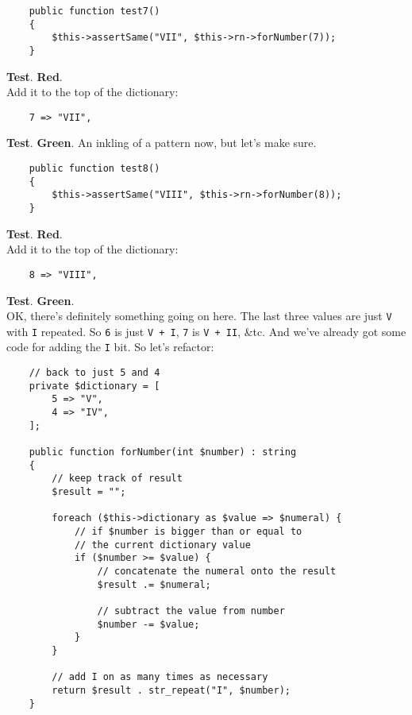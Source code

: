\begin{verbatim}
    public function test7()
    {
        $this->assertSame("VII", $this->rn->forNumber(7));
    }
\end{verbatim}

\textbf{Test}. \textbf{Red}.
\\

Add it to the top of the dictionary:

\begin{verbatim}
    7 => "VII",
\end{verbatim}

\textbf{Test}. \textbf{Green}. An inkling of a pattern now, but let's make sure.

\begin{verbatim}
    public function test8()
    {
        $this->assertSame("VIII", $this->rn->forNumber(8));
    }
\end{verbatim}

\textbf{Test}. \textbf{Red}.
\\

Add it to the top of the dictionary:

\begin{verbatim}
    8 => "VIII",
\end{verbatim}

\textbf{Test}. \textbf{Green}.
\\

OK, there's definitely something going on here. The last three values are just \texttt{V} with \texttt{I} repeated. So \texttt{6} is just \texttt{V + I}, \texttt{7} is \texttt{V + II}, \&tc. And we've already got some code for adding the \texttt{I} bit. So let's refactor:

\begin{verbatim}
    // back to just 5 and 4
    private $dictionary = [
        5 => "V",
        4 => "IV",
    ];

    public function forNumber(int $number) : string
    {
        // keep track of result
        $result = "";

        foreach ($this->dictionary as $value => $numeral) {
            // if $number is bigger than or equal to
            // the current dictionary value
            if ($number >= $value) {
                // concatenate the numeral onto the result
                $result .= $numeral;

                // subtract the value from number
                $number -= $value;
            }
        }

        // add I on as many times as necessary
        return $result . str_repeat("I", $number);
    }
\end{verbatim}

